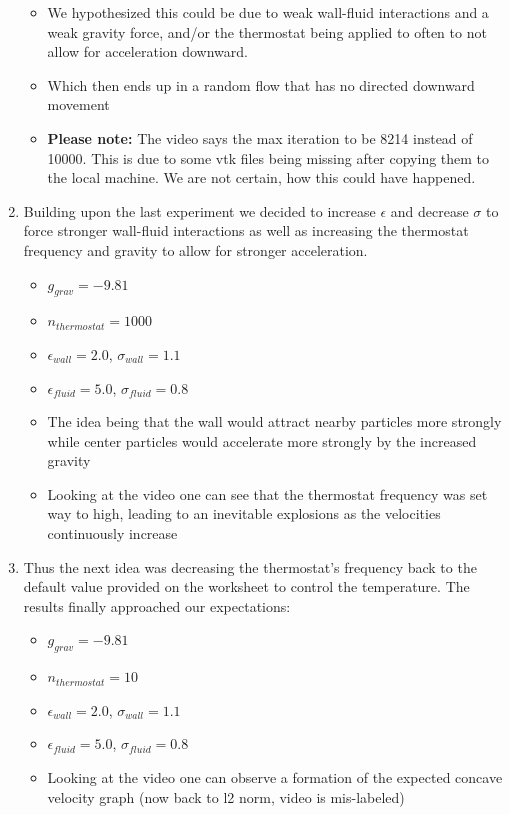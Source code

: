 \documentclass{article}
\begin{document}
\begin{enumerate}
\begin{itemize}
            \item We hypothesized this could be due to weak wall-fluid interactions and a weak gravity force, and/or the thermostat being applied to often to not allow for acceleration downward.
            \item Which then ends up in a random flow that has no directed downward movement
            \item \textbf{Please note:} The video says the max iteration to be 8214 instead of 10000. This is due to some vtk files being missing after copying them to the local machine. We are not certain, how this could have happened.
        \end{itemize}
        \item Building upon the last experiment we decided to increase $\epsilon$ and decrease $\sigma$ to force stronger wall-fluid interactions as well as increasing the thermostat frequency and gravity to allow for stronger acceleration.
        \begin{itemize}
            \item $g_{grav} = -9.81$
            \item $n_{thermostat} = 1000$
            \item $\epsilon_{wall} = 2.0$, $\sigma_{wall} = 1.1$
            \item $\epsilon_{fluid} = 5.0$, $\sigma_{fluid} = 0.8$
            \item The idea being that the wall would attract nearby particles more strongly while center particles would accelerate more strongly by the increased gravity
            \item Looking at the video one can see that the thermostat frequency was set way to high, leading to an inevitable explosions as the velocities continuously increase
        \end{itemize}
        \item Thus the next idea was decreasing the thermostat's frequency back to the default value provided on the worksheet to control the temperature. The results finally approached our expectations:
        \begin{itemize}
            \item $g_{grav} = -9.81$
            \item $n_{thermostat} = 10$
            \item $\epsilon_{wall} = 2.0$, $\sigma_{wall} = 1.1$
            \item $\epsilon_{fluid} = 5.0$, $\sigma_{fluid} = 0.8$
            \item Looking at the video one can observe a formation of the expected concave velocity graph (now back to l2 norm, video is mis-labeled)

\end{itemize}
\end{enumerate}
\end{document}
